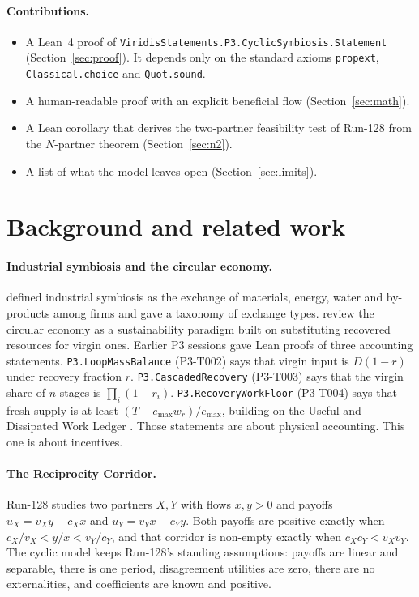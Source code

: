 \documentclass[11pt]{article}
\theoremstyle{definition}
\theoremstyle{remark}
\begin{document}
\paragraph{Contributions.}
\begin{itemize}
\item A Lean~4 proof of \texttt{ViridisStatements.P3.CyclicSymbiosis.Statement}
(Section~\ref{sec:proof}). It depends only on the standard axioms \texttt{propext},
\texttt{Classical.choice} and \texttt{Quot.sound}.
\item A human-readable proof with an explicit beneficial flow (Section~\ref{sec:math}).
\item A Lean corollary that derives the two-partner feasibility test of Run-128 from the
$N$-partner theorem (Section~\ref{sec:n2}).
\item A list of what the model leaves open (Section~\ref{sec:limits}).
\end{itemize}

\section{Background and related work}
\paragraph{Industrial symbiosis and the circular economy.}
\citet{chertow2000} defined industrial symbiosis as the exchange of materials, energy, water and
by-products among firms and gave a taxonomy of exchange types. \citet{geissdoerfer2017} review the
circular economy as a sustainability paradigm built on substituting recovered resources for virgin
ones. Earlier P3 sessions gave Lean proofs of three accounting statements.
\texttt{P3.LoopMassBalance} (P3-T002) says that virgin input is $D(1-r)$ under recovery fraction
$r$. \texttt{P3.CascadedRecovery} (P3-T003) says that the virgin share of $n$ stages is
$\prod_i(1-r_i)$. \texttt{P3.RecoveryWorkFloor} (P3-T004) says that fresh supply is at least
$(T-e_{\max}w_r)/e_{\max}$, building on the Useful and Dissipated Work Ledger
\citep{hart2026udwl}. Those statements are about physical accounting. This one is about incentives.

\paragraph{The Reciprocity Corridor.}
Run-128 \citep{hart2026rc} studies two partners $X,Y$ with flows $x,y>0$ and payoffs
$u_X=v_Xy-c_Xx$ and $u_Y=v_Yx-c_Yy$. Both payoffs are positive exactly when
$c_X/v_X<y/x<v_Y/c_Y$, and that corridor is non-empty exactly when $c_Xc_Y<v_Xv_Y$. The cyclic
model keeps Run-128's standing assumptions: payoffs are linear and separable, there is one period,
disagreement utilities are zero, there are no externalities, and coefficients are known and
positive.
\end{document}
